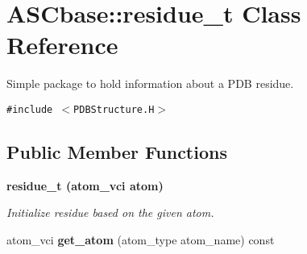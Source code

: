 \section{ASCbase::residue\_\-t Class Reference}
\label{classASCbase_1_1residue__t}
Simple package to hold information about a PDB residue.  


{\tt \#include $<$PDBStructure.H$>$}

\subsection*{Public Member Functions}
\begin{CompactItemize}
\item 
\bf{residue\_\-t} (atom\_\-vci atom)\label{classASCbase_1_1residue__t_673a2f705f7d90b695899287ca440a17}

\begin{CompactList}\small\item\em Initialize residue based on the given atom. \item\end{CompactList}\item 
atom\_\-vci \textbf{get\_\-atom} (atom\_\-type atom\_\-name) const \label{classASCbase_1_1residue__t_2e728f3de20c3259a7b63843a8de7932}

\end{CompactItemize}
